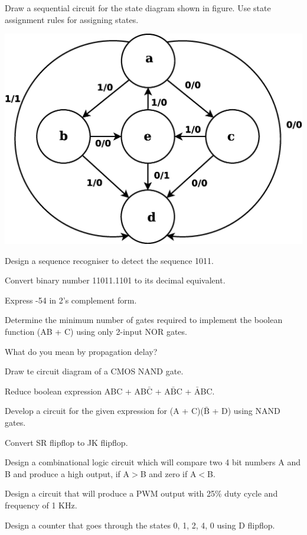 \item \iitem  Draw a sequential circuit for the state diagram shown in figure. Use state assignment rules
  for assigning states.

\begin{center}
  \includegraphics[scale=0.25]{src/s3/ai/09_305/digi2}
\end{center}
\item Design a sequence recogniser to detect the sequence 1011.
\ene \ene

\newpage

\sub{\subj}
\maxtime

\partA

\iitem Convert binary number 11011.1101 to its decimal equivalent.
\item Express -54 in 2's complement form.
\item Determine the minimum number of gates required to implement
  the boolean function (AB + C) using only 2-input NOR gates.
\item What do you mean by propagation delay?
\item Draw te circuit diagram of a CMOS NAND gate.

\markA
\partB

\item Reduce boolean expression ABC + AB$\bar{\text{C}}$ + A$\bar{\text{B}}$C + $\bar{\text{A}}$BC.
\item Develop a circuit for the given expression for (A + C)($\bar{\text{B}}$ + D) using NAND gates.
\item Convert SR flipflop to JK flipflop.
\item Design a combinational logic circuit which will compare two 4 bit numbers A and B
  and produce a high output, if A$>$B and zero if A$<$B.
\item Design a circuit that will produce a PWM output with 25\% duty cycle and frequency of 
  1 KHz.
\item Design a counter that goes through the states 0, 1, 2, 4, 0 using D flipflop.


